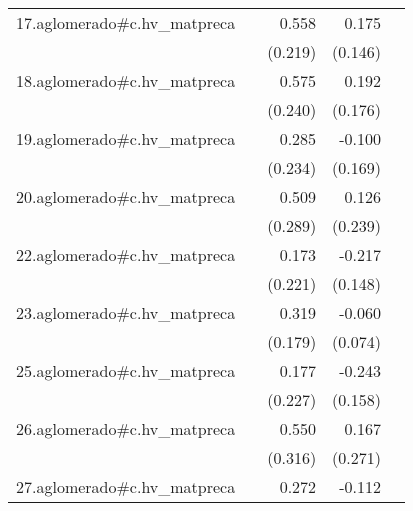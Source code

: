 {\begin{longtable}{l*{4}{D{.}{.}{-1}}}
\addlinespace
17.aglomerado#c.hv\_matpreca&                     &       0.558\sym{*}  &       0.175         &                     \\
            &                     &     (0.219)         &     (0.146)         &                     \\
\addlinespace
18.aglomerado#c.hv\_matpreca&                     &       0.575\sym{*}  &       0.192         &                     \\
            &                     &     (0.240)         &     (0.176)         &                     \\
\addlinespace
19.aglomerado#c.hv\_matpreca&                     &       0.285         &      -0.100         &                     \\
            &                     &     (0.234)         &     (0.169)         &                     \\
\addlinespace
20.aglomerado#c.hv\_matpreca&                     &       0.509         &       0.126         &                     \\
            &                     &     (0.289)         &     (0.239)         &                     \\
\addlinespace
22.aglomerado#c.hv\_matpreca&                     &       0.173         &      -0.217         &                     \\
            &                     &     (0.221)         &     (0.148)         &                     \\
\addlinespace
23.aglomerado#c.hv\_matpreca&                     &       0.319         &      -0.060         &                     \\
            &                     &     (0.179)         &     (0.074)         &                     \\
\addlinespace
25.aglomerado#c.hv\_matpreca&                     &       0.177         &      -0.243         &                     \\
            &                     &     (0.227)         &     (0.158)         &                     \\
\addlinespace
26.aglomerado#c.hv\_matpreca&                     &       0.550         &       0.167         &                     \\
            &                     &     (0.316)         &     (0.271)         &                     \\
\addlinespace
27.aglomerado#c.hv\_matpreca&                     &       0.272         &      -0.112\sym{*}  &                     \\

\end{longtable}}
